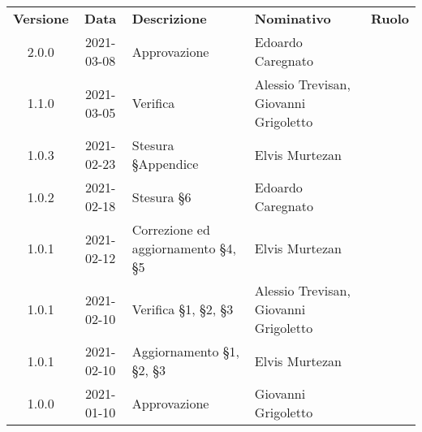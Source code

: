 {
    \renewcommand{\arraystretch}{1.5}
    \centering
    \begin{longtable}{ c c  C{3.5cm}  C{3.5cm}  c }
        \rowcolor{\primaryColor}
        \textcolor{\secondaryColor}{
        \textbf{Versione}}     & \textcolor{\secondaryColor}{\textbf{Data}}       & \textcolor{\secondaryColor}
        {\textbf{Descrizione}} & \textcolor{\secondaryColor}{\textbf{Nominativo}} & \textcolor{\secondaryColor}{\textbf{Ruolo}}                          \\



        2.0.0  & 
        2021-03-08  & 
        Approvazione& 
        Edoardo Caregnato & 
        \responsabile{} \\
        
        1.1.0  & 
        2021-03-05  & 
        Verifica& 
        Alessio Trevisan, Giovanni Grigoletto & 
        \verificatore{} \\

        1.0.3  & 
        2021-02-23  & 
        Stesura §Appendice & 
        Elvis Murtezan & 
        \responsabile{} \\

        1.0.2  & 
        2021-02-18  & 
        Stesura §6  & 
        Edoardo Caregnato & 
        \responsabile{} \\
        
        1.0.1  & 
        2021-02-12  & 
        Correzione ed aggiornamento §4, §5 & 
        Elvis Murtezan & 
        \responsabile{} \\

        1.0.1  & 
        2021-02-10  & 
        Verifica §1, §2, §3 & 
        Alessio Trevisan, Giovanni Grigoletto & 
        \verificatore{} \\
        
        1.0.1  & 
        2021-02-10  & 
        Aggiornamento §1, §2, §3 & 
        Elvis Murtezan & 
        \responsabile{} \\

        1.0.0  & 
        2021-01-10  & 
        Approvazione & 
        Giovanni Grigoletto & 
        \responsabile{} \\


\end{longtable}}
